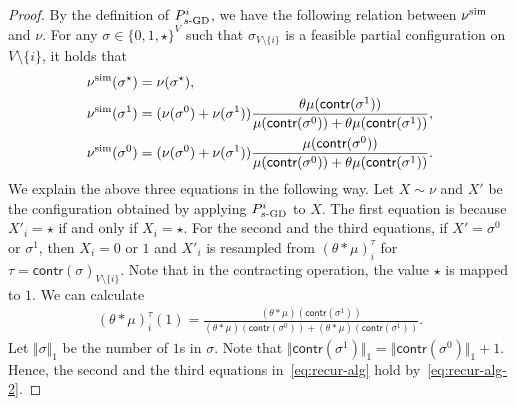 \documentclass[11pt,a4paper]{article}
\theoremstyle{definition}
\newcommand{\nus}{\nu^{\textnormal{sim}}}
\begin{document}
\begin{proof}
By the definition of $P^i_{s\textnormal{-GD}}$,
we have the following relation between $\nus$ and $\nu$. For any $\sigma\in \{0,1,\star\}^V$ such that $\sigma_{V \setminus \{i\}}$ is a feasible partial configuration on $V \setminus \{i\}$, it holds that
\begin{align}\label{eq:recur-alg}
\begin{split}
&\nus(\sigma^{\star}) = \nu(\sigma^{\star}),\\
&\nus(\sigma^1)=(\nu(\sigma^0)+\nu(\sigma^1))\frac{\theta \mu(\textsf{contr}(\sigma^1))}{\mu(\textsf{contr}(\sigma^0))+\theta \mu(\textsf{contr}(\sigma^1))},\\
&\nus(\sigma^0)=(\nu(\sigma^0)+\nu(\sigma^1))\frac{\mu(\textsf{contr}(\sigma^0))}{\mu(\textsf{contr}(\sigma^0))+\theta \mu(\textsf{contr}(\sigma^1))}.
\end{split}
\end{align}
We explain the above three equations in the following way. Let $X \sim \nu$ and $X'$ be the configuration obtained by applying $P^i_{s\textnormal{-GD}}$ to $X$.
The first equation is because $X'_i = \star$ if and only if $X_i = \star$.
For the second and the third equations, if $X' = \sigma^0$ or $\sigma^1$, then $X_i = 0$ or $1$ and $X'_i$ is resampled from $(\theta * \mu)_i^\tau$ for $\tau = \textsf{contr}(\sigma)_{V \setminus \{i\}}$. Note that in the contracting operation, the value $\star$ is mapped to $1$. We can calculate
\begin{align}\label{eq:recur-alg-2}
    (\theta * \mu)_i^{\tau}(1) = \frac{(\theta * \mu)(\textsf{contr}(\sigma^1))}{(\theta * \mu)(\textsf{contr}(\sigma^0))+(\theta * \mu)(\textsf{contr}(\sigma^1))}.
\end{align}
Let $\Vert \sigma \Vert_1$ be the number of $1$s in $\sigma$. Note that $\Vert \textsf{contr}(\sigma^1) \Vert_1 = \Vert \textsf{contr}(\sigma^0) \Vert_1 + 1$. Hence, the second and the third equations in~\eqref{eq:recur-alg} hold by~\eqref{eq:recur-alg-2}.


\end{proof}
\end{document}
